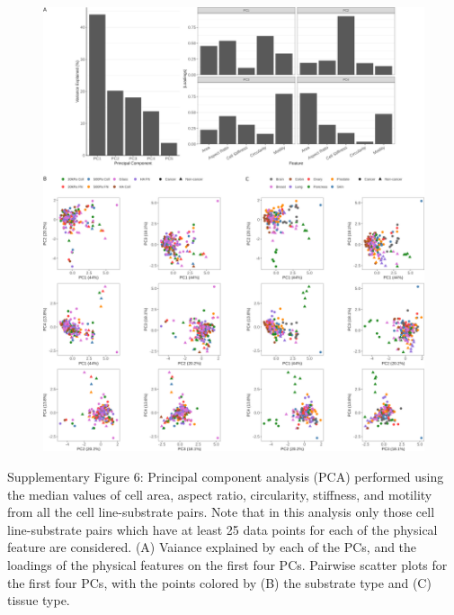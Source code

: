 \documentclass[11pt,letterpaper,english,oneside]{article} %
\begin{document}
\begin{figure}[H]
    \hspace*{-2cm}
    \centering
    \includegraphics[scale=0.7]{../Figures/Supplementary_Figure6/supplementary_figure6.png}
    \caption{}
    \label{fig:fig6}
\end{figure}
\begin{adjustwidth}{1cm}{1cm}
  Supplementary Figure 6: Principal component analysis (PCA) performed using the median values of cell area, aspect ratio, circularity, stiffness, and motility from all the cell line-substrate pairs.
  Note that in this analysis only those cell line-substrate pairs which have at least 25 data points for each of the physical feature are considered.
  (A) Vaiance explained by each of the PCs, and the loadings of the physical features on the first four PCs.
  Pairwise scatter plots for the first four PCs, with the points colored by (B) the substrate type and (C) tissue type. 
\end{adjustwidth}
\end{document}
